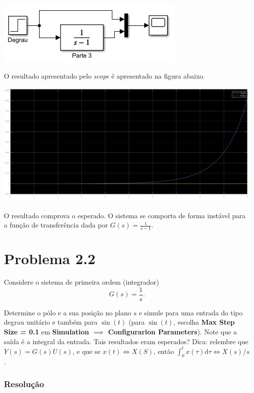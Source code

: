 \documentclass[
]{book}
\theoremstyle{definition}
\theoremstyle{definition}
\theoremstyle{definition}
\theoremstyle{remark}
\begin{document}
\includegraphics{Imagens/Lab2/sim2.jpg}

O resultado apresentado pelo \emph{scope} é apresentado na figura abaixo.

\includegraphics{Imagens/Lab2/resultSim2.jpg}

O resultado comprova o esperado. O sistema se comporta de forma instável para a função de transferência dada por \(G(s) = \frac {1}{s-1}\).

\hypertarget{problema-2.2}{%
\section*{Problema 2.2}\label{problema-2.2}}

Considere o sistema de primeira ordem (integrador)
\[
G(s) = \frac {1}{s}.
\]

Determine o pólo e a sua posição no plano \(s\) e simule para uma entrada do tipo degrau unitário e também para \(\sin {(t)}\) (para \(\sin {(t)}\), escolha \textbf{Max Step Size = 0.1} em \textbf{Simulation \(\implies\) Configurarion Parameters}). Note que a saída é a integral da entrada. Tais resultados eram esperados? Dica: relembre que \(Y(s) = G(s)U(s)\), e que se \(x(t) \iff X(S)\), então \(\int_0^t x(\tau) \mathrm{d}\tau \iff X(s)/s\).

\hypertarget{resoluuxe7uxe3o-1}{%
\subsubsection*{Resolução}\label{resoluuxe7uxe3o-1}}
\end{document}
